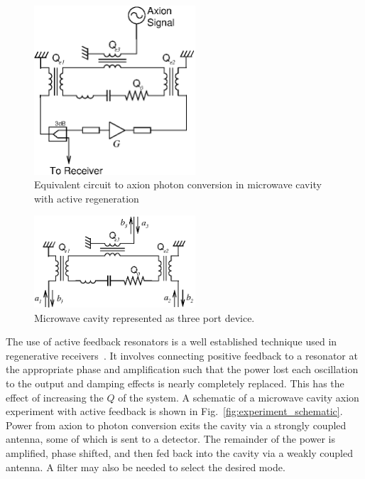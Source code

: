 \documentclass[aps,prl,twocolumn,groupedaddress]{revtex4-1}
\begin{document}
\begin{figure}
\includegraphics[width=6cm]{figs/equivalent_circuit.eps}
\caption{\label{fig:equiv_circuit} Equivalent circuit to axion photon conversion in microwave cavity with active regeneration}
\end{figure}

\begin{figure}
\includegraphics[width=6cm]{figs/amplitude_definitions.eps}
\caption{\label{fig:amplitude_defs} Microwave cavity represented as three port device.}
\end{figure}

The use of active feedback resonators is a well established technique used in regenerative receivers~\cite{armstrong1914wireless}.
It involves connecting positive feedback to a resonator at the appropriate phase and amplification such that the power lost each oscillation to the output and damping effects is nearly completely replaced.  
This has the effect of increasing the $Q$ of the system.
A schematic of a microwave cavity axion experiment with active feedback is shown in Fig.~\ref{fig:experiment_schematic}.   Power from axion to photon conversion exits the cavity via a strongly coupled antenna, some of which is sent to a detector.  The remainder of the power is amplified, phase shifted, and then fed back into the cavity via a weakly coupled antenna.  A filter may also be needed to select the desired mode. 
\end{document}
